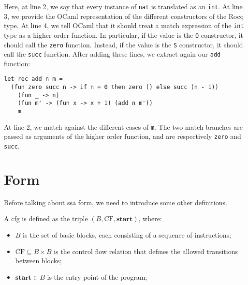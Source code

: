 Here, at line 2, we say that every instance of \texttt{nat} is translated as an \texttt{int}. At line 3, we provide the OCaml representation of the different constructors of the Rocq type. At line 4, we tell OCaml that it should treat a match expression of the \texttt{int} type as a higher order function. In particular, if the value is the \texttt{O} constructor, it should call the \texttt{zero} function. Instead, if the value is the \texttt{S} constructor, it should call the \texttt{succ} function. After adding these lines, we extract again our \texttt{add} function:

\begin{lstlisting}[style=OCaml]
let rec add n m =
  (fun zero succ n -> if n = 0 then zero () else succ (n - 1))
    (fun _ -> n)
    (fun m' -> (fun x -> x + 1) (add n m'))
    m
\end{lstlisting}

At line 2, we match against the different cases of \texttt{m}. The two match branches are passed as arguments of the higher order function, and are respectively \texttt{zero} and \texttt{succ}.

\section{ Form}
\label{sec:ssa}


Before talking about \gls{ssa} form, we need to introduce some other definitions.

\begin{definition}\label{def:cfg}
  A \gls{cfg} is defined as the triple $(B, \text{CF}, \textbf{start})$, where:
  \begin{itemize}
    \item $B$ is the set of basic blocks, each consisting of a sequence of instructions;
    \item $\text{CF} \subseteq B \times B$ is the control flow relation that defines the allowed transitions between blocks;
    \item $\textbf{start} \in B$ is the entry point of the program;
  \end{itemize}
\end{definition}

